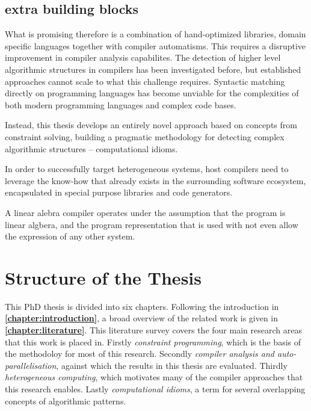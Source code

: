     \subsection*{extra building blocks}

    What is promising therefore is a combination of hand-optimized libraries,
    domain specific languages together with compiler automatisms.
    This requires a disruptive improvement in compiler analysis capabilites.
    The detection of higher level algorithmic structures in compilers has been
    investigated before, but established approaches cannot scale to what
    this challenge requires.
    Syntactic matching directly on programming languages has become
    unviable for the complexities of both modern programming languages and
    complex code bases.

    Instead, this thesis develops an entirely novel approach based on concepts
    from constraint solving, building a pragmatic methodology for detecting
    complex algorithmic structures -- computational idioms.

    In order to successfully target heterogeneous systems, host compilers need
    to leverage the know-how that already exists in the surrounding software
    ecosystem, encapsulated in special purpose libraries and code generators.

    A linear alebra compiler operates under the assumption that the program is
    linear algbera, and the program representation that is used with not even
    allow the expression of any other system.


\pagebreak
\section{Structure of the Thesis}

    This PhD thesis is divided into six chapters.
    Following the introduction in {\bf\cref{chapter:introduction}}, a broad
    overview of the related work is given in {\bf\cref{chapter:literature}}.
    This literature survey covers the four main research areas that this work
    is placed in.
    Firstly {\em constraint programming}, which is the basis of the methodoloy
    for most of this research.
    Secondly {\em compiler analysis and auto-parallelisation}, against which the
    results in this thesis are evaluated.
    Thirdly {\em heterogeneous computing}, which motivates many of the compiler
    approaches that this research enables.
    Lastly {\em computational idioms}, a term for several overlapping concepts
    of algorithmic patterns.

